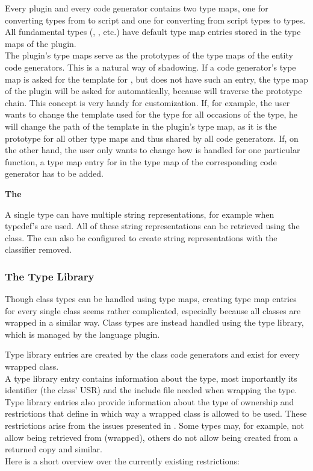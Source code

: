 Every plugin and every code generator contains two type maps, one for converting types from  to script and one for converting from script types to  types. All fundamental  types (, , etc.) have default type map entries stored in the type maps of the plugin.\\
The plugin's type maps serve as the  prototypes of the type maps of the entity code generators. This is a natural way of shadowing. If a code generator's type map is asked for the template for , but does not have such an entry, the type map of the plugin will be asked for  automatically, because  will traverse the prototype chain. This concept is very handy for customization. If, for example, the user wants to change the template used for the  type for all occasions of the type, he will change the path of the template in the plugin's type map, as it is the prototype for all other type maps and thus shared by all code generators. If, on the other hand, the user only wants to change how  is handled for one particular function, a type map entry for  in the type map of the corresponding code generator has to be added.

\textbf{The }

A single type can have multiple string representations, for example when typedef's are used. All of these string representations can be retrieved using the  class. The  can also be configured to create string representations with the  classifier removed.

\subsubsection{The Type Library}

Though class types can be handled using type maps, creating type map entries for every single class seems rather complicated, especially because all classes are wrapped in a similar way. Class types are instead handled using the type library, which is managed by the language plugin.

Type library entries are created by the class code generators and exist for every wrapped class.\\
A type library entry contains information about the type, most importantly its identifier (the class' USR) and the include file needed when wrapping the type.\\
Type library entries also provide information about the type of ownership and restrictions that define in which way a wrapped class is allowed to be used. These restrictions arise from the issues presented in . Some types may, for example, not allow being retrieved from  (wrapped), others do not allow being created from a returned copy and similar.\\
Here is a short overview over the currently existing restrictions:

